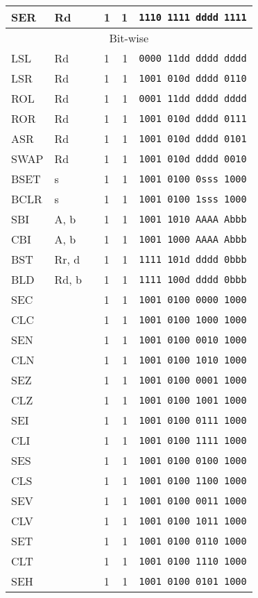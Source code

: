 \documentclass[11pt]{article}
\begin{document}
\begin{center}
\begin{longtable}{|l|l| p{}|l|r|l|}
SER & Rd &  & 1 & 1 & \texttt{1110 1111 dddd 1111}\\
\hline\hline
\multicolumn{6}{|c|}{Bit-wise} \\
\hline
LSL & Rd &  & 1 & 1 & \texttt{0000 11dd dddd dddd}\\
LSR & Rd &  & 1 & 1 & \texttt{1001 010d dddd 0110}\\
ROL & Rd &  & 1 & 1 & \texttt{0001 11dd dddd dddd}\\
ROR & Rd &  & 1 & 1 & \texttt{1001 010d dddd 0111}\\
ASR & Rd &  & 1 & 1 & \texttt{1001 010d dddd 0101}\\
SWAP & Rd &  & 1 & 1 & \texttt{1001 010d dddd 0010}\\
BSET & s &  & 1 & 1 & \texttt{1001 0100 0sss 1000}\\
BCLR & s &  & 1 & 1 & \texttt{1001 0100 1sss 1000}\\
SBI & A, b &  & 1 & 1 & \texttt{1001 1010 AAAA Abbb}\\
CBI & A, b &  & 1 & 1 & \texttt{1001 1000 AAAA Abbb}\\
BST & Rr, d &  & 1 & 1 & \texttt{1111 101d dddd 0bbb}\\
BLD & Rd, b &  & 1 & 1 & \texttt{1111 100d dddd 0bbb}\\
SEC &  &  & 1 & 1 & \texttt{1001 0100 0000 1000}\\
CLC &  &  & 1 & 1 & \texttt{1001 0100 1000 1000}\\
SEN &  &  & 1 & 1 & \texttt{1001 0100 0010 1000}\\
CLN &  &  & 1 & 1 & \texttt{1001 0100 1010 1000}\\
SEZ &  &  & 1 & 1 & \texttt{1001 0100 0001 1000}\\
CLZ &  &  & 1 & 1 & \texttt{1001 0100 1001 1000}\\
SEI &  &  & 1 & 1 & \texttt{1001 0100 0111 1000}\\
CLI &  &  & 1 & 1 & \texttt{1001 0100 1111 1000}\\
SES &  &  & 1 & 1 & \texttt{1001 0100 0100 1000}\\
CLS &  &  & 1 & 1 & \texttt{1001 0100 1100 1000}\\
SEV &  &  & 1 & 1 & \texttt{1001 0100 0011 1000}\\
CLV &  &  & 1 & 1 & \texttt{1001 0100 1011 1000}\\
SET &  &  & 1 & 1 & \texttt{1001 0100 0110 1000}\\
CLT &  &  & 1 & 1 & \texttt{1001 0100 1110 1000}\\
SEH &  &  & 1 & 1 & \texttt{1001 0100 0101 1000}\\

\end{longtable}
\end{center}
\end{document}
